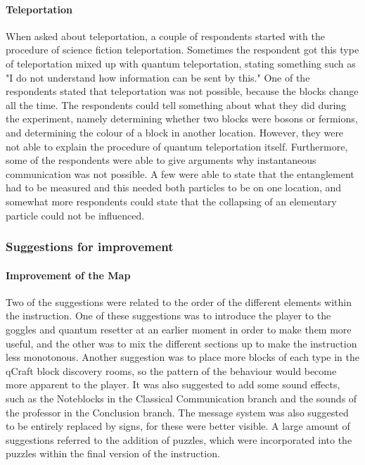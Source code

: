 \documentclass[11pt,twoside]{report} %
\begin{document}
\paragraph{Teleportation}

When asked about teleportation, a couple of respondents started with the procedure of science fiction teleportation. Sometimes the respondent got this type of teleportation mixed up with quantum teleportation, stating something such as "I do not understand how information can be sent by this." One of the respondents stated that teleportation was not possible, because the blocks change all the time. The respondents could tell something about what they did during the experiment, namely determining whether two blocks were bosons or fermions, and determining the colour of a block in another location. However, they were not able to explain the procedure of quantum teleportation itself. Furthermore, some of the respondents were able to give arguments why instantaneous communication was not possible. A few were able to state that the entanglement had to be measured and this needed both particles to be on one location, and somewhat more respondents could state that the collapsing of an elementary particle could not be influenced.

\subsubsection{Suggestions for improvement}

\paragraph{Improvement of the Map}

Two of the suggestions were related to the order of the different elements within the instruction. One of these suggestions was to introduce the player to the goggles and quantum resetter at an earlier moment in order to make them more useful, and the other was to mix the different sections up to make the instruction less monotonous. Another suggestion was to place more blocks of each type in the qCraft block discovery rooms, so the pattern of the behaviour would become more apparent to the player. It was also suggested to add some sound effects, such as the Noteblocks in the Classical Communication branch and the sounds of the professor in the Conclusion branch. The message system was also suggested to be entirely replaced by signs, for these were better visible. A large amount of suggestions referred to the addition of puzzles, which were incorporated into the puzzles within the final version of the instruction.
\end{document}
